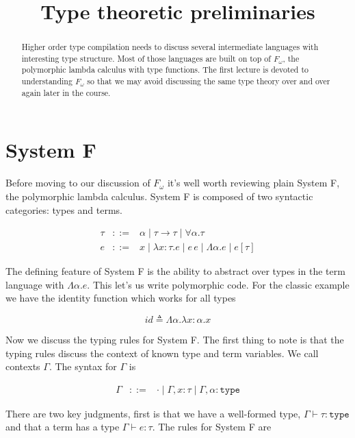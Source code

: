 \documentclass{article}
\title{Type theoretic preliminaries}
\newcommand{\type}{\ensuremath{\mathtt{type}}}
\begin{document}
\maketitle

\begin{abstract}
  Higher order type compilation needs to discuss several intermediate languages
  with interesting type structure. Most of those languages are built on top of
  $F_\omega$, the polymorphic lambda calculus with type functions. The first
  lecture is devoted to understanding $F_\omega$ so that we may avoid discussing
  the same type theory over and over again later in the course.
\end{abstract}

\section{System F}

Before moving to our discussion of $F_\omega$ it's well worth
reviewing plain System F, the polymorphic lambda calculus. System F is
composed of two syntactic categories: types and terms.

\[
\begin{array}{lcl}
  \tau & ::= & \alpha \mid \tau \to \tau \mid \forall \alpha. \tau\\
  e & ::= & x \mid \lambda x : \tau. e \mid e \, e \mid
            \Lambda \alpha. e \mid e[\tau]
\end{array}
\]

The defining feature of System F is the ability to abstract over types
in the term language with $\Lambda \alpha. e$. This let's us write
polymorphic code. For the classic example we have the identity
function which works for all types

\[
  id \triangleq \Lambda \alpha. \lambda x : \alpha. x
\]

Now we discuss the typing rules for System F. The first thing to note
is that the typing rules discuss the context of known type and term
variables. We call contexts $\Gamma$. The syntax for $\Gamma$ is

\[
\begin{array}{lcl}
  \Gamma & ::= & \cdot \mid \Gamma, x : \tau \mid \Gamma, \alpha : \type
\end{array}
\]

There are two key
judgments, first is that we have a well-formed type, $\Gamma \vdash
\tau : \type$ and that a term has a type $\Gamma \vdash e : \tau$. The
rules for System F are
\end{document}
